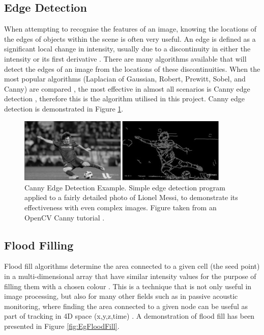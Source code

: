 \subsection{Edge Detection}
When attempting to recognise the features of an image, knowing the locations of the edges of objects within the scene is often very useful. An edge is defined as a significant local change in intensity, usually due to a discontinuity in either the intensity or its first derivative \cite{jain1995machine}. There are many algorithms available that will detect the edges of an image from the locations of these discontinuities. When the most popular algorithms (Laplacian of Gaussian, Robert, Prewitt, Sobel, and Canny) are compared \cite{maini2009study}, the most effective in almost all scenarios is Canny edge detection \cite{canny1986computational}, therefore this is the algorithm utilised in this project. Canny edge detection is demonstrated in Figure \ref{fig:canny1}.

\begin{figure}[H]
    \begin{center}
      \includegraphics[width=0.9\textwidth]{Figures/canny2.png}
      \caption[Canny Edge Detection Example]{Canny Edge Detection Example. Simple edge detection program applied to a fairly detailed photo of Lionel Messi, to demonstrate its effectiveness with even complex images. Figure taken from an OpenCV Canny tutorial \cite{Canny1Source}.}
      \label{fig:canny1}
    \end{center}
\end{figure}

\subsection{Flood Filling}

Flood fill algorithms determine the area connected to a given cell (the seed point) in a multi-dimensional array that have similar intensity values for the purpose of filling them with a chosen colour \cite{FloodFill}. This is a technique that is not only useful in image processing, but also for many other fields such as in passive acoustic monitoring, where finding the area connected to a given node can be useful as part of tracking in 4D space (x,y,z,time) \cite{nosal2008flood}. A demonstration of flood fill has been presented in Figure \ref{fig:EgFloodFill}.

